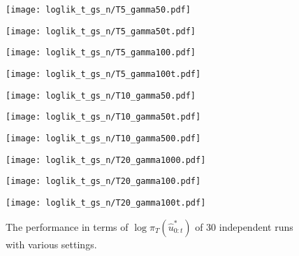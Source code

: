 \begin{figure}[!htbp]
    \centering
    \begin{minipage}{.5\textwidth}
        \centering
        \texttt{[image: loglik\_t\_gs\_n/T5\_gamma50.pdf]}
    \end{minipage}%
    \begin{minipage}{0.5\textwidth}
        \centering
        \texttt{[image: loglik\_t\_gs\_n/T5\_gamma50t.pdf]}
    \end{minipage}
    \begin{minipage}{0.5\textwidth}
        \centering
        \texttt{[image: loglik\_t\_gs\_n/T5\_gamma100.pdf]}
    \end{minipage}%
    \begin{minipage}{0.5\textwidth}
        \centering
        \texttt{[image: loglik\_t\_gs\_n/T5\_gamma100t.pdf]}
    \end{minipage}
    \begin{minipage}{0.5\textwidth}
        \centering
        \texttt{[image: loglik\_t\_gs\_n/T10\_gamma50.pdf]}
    \end{minipage}%
    \begin{minipage}{0.5\textwidth}
        \centering
        \texttt{[image: loglik\_t\_gs\_n/T10\_gamma50t.pdf]}
    \end{minipage}
    \begin{minipage}{0.5\textwidth}
        \centering
        \texttt{[image: loglik\_t\_gs\_n/T10\_gamma500.pdf]}
    \end{minipage}%
    \begin{minipage}{0.5\textwidth}
        \centering
        \texttt{[image: loglik\_t\_gs\_n/T20\_gamma1000.pdf]}
    \end{minipage}
    \begin{minipage}{0.5\textwidth}
        \centering
        \texttt{[image: loglik\_t\_gs\_n/T20\_gamma100.pdf]}
    \end{minipage}%
    \begin{minipage}{0.5\textwidth}
        \centering
        \texttt{[image: loglik\_t\_gs\_n/T20\_gamma100t.pdf]}
    \end{minipage}
    \caption{The performance in terms of $\log\pi_T(\hat{u}^*_{0:t})$ of 30 independent runs with various settings.}
    \label{fig:rm}
\end{figure}

